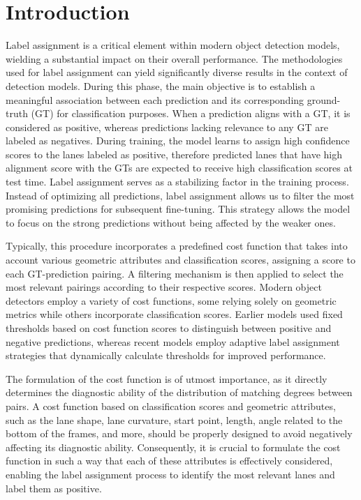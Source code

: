 \documentclass[10pt,twocolumn,letterpaper]{article}
\begin{document}
\section{Introduction}
Label assignment is a critical element within modern object detection models, wielding a substantial impact on their overall performance. The methodologies used for label assignment can yield significantly diverse results in the context of detection models. During this phase, the main objective is to establish a meaningful association between each prediction and its corresponding ground-truth (GT) for classification purposes. When a prediction aligns with a GT, it is considered as positive, whereas predictions lacking relevance to any GT are labeled as negatives. During training, the model learns to assign high confidence scores to the lanes labeled as positive, therefore predicted lanes that have high alignment score with the GTs are expected to receive high classification scores at test time. Label assignment serves as a stabilizing factor in the training process. Instead of optimizing all predictions, label assignment allows us to filter the most promising predictions for subsequent fine-tuning. This strategy allows the model to focus on the strong predictions without being affected by the weaker ones.

Typically, this procedure incorporates a predefined cost function that takes into account various geometric attributes and classification scores, assigning a score to each GT-prediction pairing. A filtering mechanism is then applied to select the most relevant pairings according to their respective scores. Modern object detectors employ a variety of cost functions, some relying solely on geometric metrics while others incorporate classification scores. Earlier models used fixed thresholds based on cost function scores to distinguish between positive and negative predictions, whereas recent models employ adaptive label assignment strategies that dynamically calculate thresholds for improved performance. 

The formulation of the cost function is of utmost importance, as it directly determines the diagnostic ability of the distribution of matching degrees between pairs. A cost function based on classification scores and geometric attributes, such as the lane shape, lane curvature, start point, length, angle related to the bottom of the frames, and more, should be properly designed to avoid negatively affecting its diagnostic ability. Consequently, it is crucial to formulate the cost function in such a way that each of these attributes is effectively considered, enabling the label assignment process to identify the most relevant lanes and label them as positive.
\end{document}

